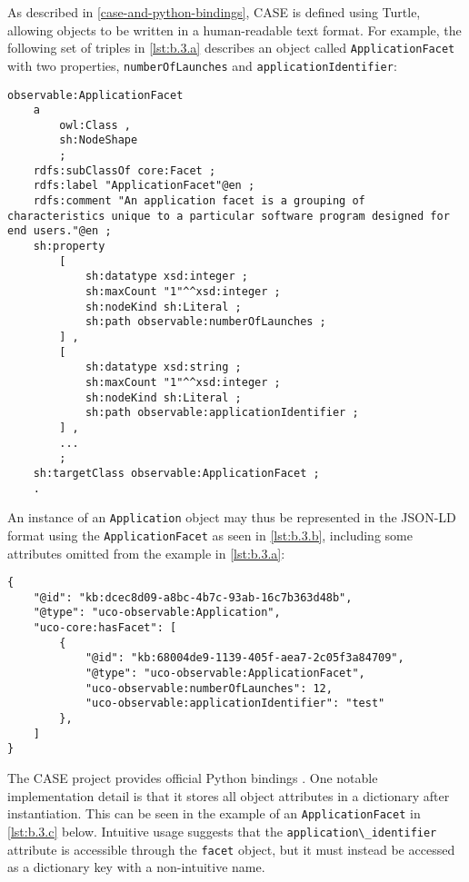 As described in \autoref{case-and-python-bindings}, CASE is defined using Turtle, allowing objects to be
written in a human-readable text format. For example, the following set
of triples in \autoref{lst:b.3.a} describes an object called
\passthrough{\lstinline!ApplicationFacet!} with two properties,
\passthrough{\lstinline!numberOfLaunches!} and
\passthrough{\lstinline!applicationIdentifier!}:

\begin{lstlisting}[label={lst:b.3.a}, caption={Example CASE object definition for applications \cite{UcoProjectUCO2025}}, ]
observable:ApplicationFacet
    a
        owl:Class ,
        sh:NodeShape
        ;
    rdfs:subClassOf core:Facet ;
    rdfs:label "ApplicationFacet"@en ;
    rdfs:comment "An application facet is a grouping of characteristics unique to a particular software program designed for end users."@en ;
    sh:property
        [
            sh:datatype xsd:integer ;
            sh:maxCount "1"^^xsd:integer ;
            sh:nodeKind sh:Literal ;
            sh:path observable:numberOfLaunches ;
        ] ,
        [
            sh:datatype xsd:string ;
            sh:maxCount "1"^^xsd:integer ;
            sh:nodeKind sh:Literal ;
            sh:path observable:applicationIdentifier ;
        ] ,
        ...
        ;
    sh:targetClass observable:ApplicationFacet ;
    .
\end{lstlisting}

An instance of an \passthrough{\lstinline!Application!} object may thus
be represented in the JSON-LD format using the
\passthrough{\lstinline!ApplicationFacet!} as seen in
\autoref{lst:b.3.b}, including some attributes omitted from the example
in \autoref{lst:b.3.a}:

\begin{lstlisting}[label={lst:b.3.b}, caption={Instantiated CASE application object as JSON-LD }, ]
{
    "@id": "kb:dcec8d09-a8bc-4b7c-93ab-16c7b363d48b",
    "@type": "uco-observable:Application",
    "uco-core:hasFacet": [
        {
            "@id": "kb:68004de9-1139-405f-aea7-2c05f3a84709",
            "@type": "uco-observable:ApplicationFacet",
            "uco-observable:numberOfLaunches": 12,
            "uco-observable:applicationIdentifier": "test"
        },
    ]
}
\end{lstlisting}

The CASE project provides official Python bindings
\cite{CaseworkCASEMappingPython}. One notable implementation detail
is that it stores all object attributes in a dictionary after
instantiation. This can be seen in the example of an
\passthrough{\lstinline!ApplicationFacet!} in \autoref{lst:b.3.c} below.
Intuitive usage suggests that the
\passthrough{\lstinline!application\_identifier!} attribute is
accessible through the \passthrough{\lstinline!facet!} object, but it
must instead be accessed as a dictionary key with a non-intuitive name.

